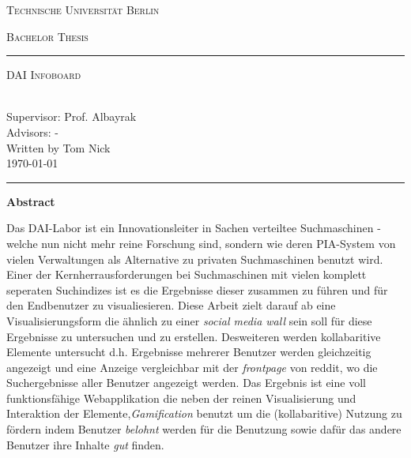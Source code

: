 \documentclass[12pt,twoside]{book}
\renewcommand{\title}{DAI Infoboard}
\renewcommand{\author}{Tom Nick}
\begin{document}
\begin{titlepage}
\begin{center}
{\Huge \textsc{Technische Universität Berlin}}
{\fontsize{2.5cm}{2cm}\selectfont \textsc{Bachelor Thesis}\par}
\vspace{1cm}
\hrule
\vspace{0.3cm}
{\Huge \textsc{\title{}}\par}
~\\[0.1cm]
{\Large Supervisor: Prof. Albayrak}\\[0.1cm]
{\Large Advisors: -}\\[0.3cm]
{\Large Written by \author{}}\\[0.1cm]
{\Large \today}
\vspace{0.55cm}
\hrule
\end{center}
\vfill
\begin{center}{\Large\textbf{Abstract}}\end{center}

Das DAI-Labor ist ein Innovationsleiter in Sachen verteiltee Suchmaschinen - welche nun nicht mehr reine Forschung sind, sondern wie deren PIA-System von vielen Verwaltungen als Alternative zu privaten Suchmaschinen benutzt wird. Einer der Kernherrausforderungen bei Suchmaschinen mit vielen komplett seperaten Suchindizes ist es die Ergebnisse dieser zusammen zu führen und für den Endbenutzer zu visualiesieren. Diese Arbeit zielt darauf ab eine Visualisierungsform die ähnlich zu einer \textit{social media wall} sein soll für diese Ergebnisse zu untersuchen und zu erstellen. Desweiteren werden kollabaritive Elemente untersucht d.h. Ergebnisse mehrerer Benutzer werden gleichzeitig angezeigt und eine Anzeige vergleichbar mit der \textit{frontpage} von reddit, wo die Suchergebnisse aller Benutzer angezeigt werden. Das Ergebnis ist eine voll funktionsfähige Webapplikation die neben der reinen Visualisierung und Interaktion der Elemente,\textit{Gamification} benutzt um die (kollabaritive) Nutzung zu fördern indem Benutzer \textit{belohnt} werden für die Benutzung sowie dafür das andere Benutzer ihre Inhalte \textit{gut} finden.

\end{titlepage}

\end{document}
